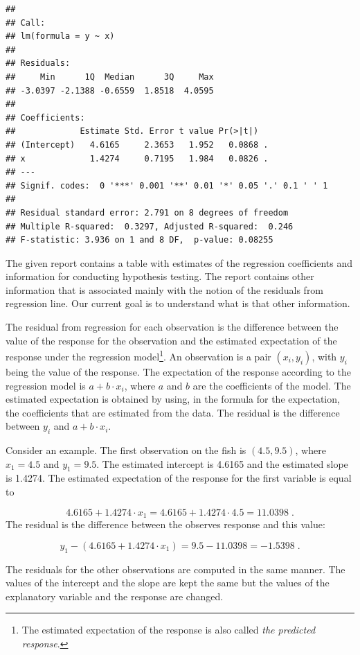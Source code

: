 \documentclass[
]{krantz}
\theoremstyle{definition}
\theoremstyle{definition}
\theoremstyle{definition}
\theoremstyle{remark}
\begin{document}
\begin{verbatim}
## 
## Call:
## lm(formula = y ~ x)
## 
## Residuals:
##     Min      1Q  Median      3Q     Max 
## -3.0397 -2.1388 -0.6559  1.8518  4.0595 
## 
## Coefficients:
##             Estimate Std. Error t value Pr(>|t|)  
## (Intercept)   4.6165     2.3653   1.952   0.0868 .
## x             1.4274     0.7195   1.984   0.0826 .
## ---
## Signif. codes:  0 '***' 0.001 '**' 0.01 '*' 0.05 '.' 0.1 ' ' 1
## 
## Residual standard error: 2.791 on 8 degrees of freedom
## Multiple R-squared:  0.3297, Adjusted R-squared:  0.246 
## F-statistic: 3.936 on 1 and 8 DF,  p-value: 0.08255
\end{verbatim}

The given report contains a table with estimates of the regression
coefficients and information for conducting hypothesis testing. The
report contains other information that is associated mainly with the
notion of the residuals from regression line. Our current goal is to
understand what is that other information.

The residual from regression for each observation is the difference
between the value of the response for the observation and the estimated
expectation of the response under the regression model\footnote{The estimated expectation of the response is also called \emph{the
  predicted response}.}. An
observation is a pair \((x_i,y_i)\), with \(y_i\) being the value of the
response. The expectation of the response according to the regression
model is \(a + b \cdot x_i\), where \(a\) and \(b\) are the coefficients of
the model. The estimated expectation is obtained by using, in the
formula for the expectation, the coefficients that are estimated from
the data. The residual is the difference between \(y_i\) and
\(a + b \cdot x_i\).

Consider an example. The first observation on the fish is \((4.5, 9.5)\),
where \(x_1 = 4.5\) and \(y_1 = 9.5\). The estimated intercept is 4.6165 and
the estimated slope is 1.4274. The estimated expectation of the response
for the first variable is equal to

\[4.6165 + 1.4274 \cdot x_1 = 4.6165 + 1.4274 \cdot 4.5  =  11.0398\;.\]
The residual is the difference between the observes response and this
value:

\[y_1 - (4.6165 + 1.4274 \cdot x_1) = 9.5 - 11.0398 = -1.5398\;.\]

The residuals for the other observations are computed in the same
manner. The values of the intercept and the slope are kept the same but
the values of the explanatory variable and the response are changed.
\end{document}
